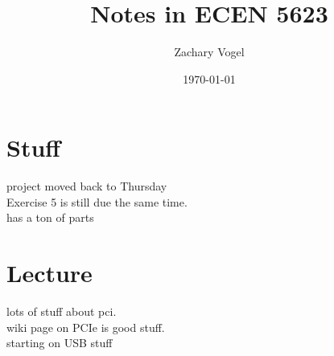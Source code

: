 \documentclass{article}
\author{Zachary Vogel}
\date{\today}
\title{Notes in ECEN 5623}
\begin{document}
\maketitle


\section*{Stuff}
project moved back to Thursday\\
Exercise 5 is still due the same time.\\
has a ton of parts\\

\section*{Lecture}
lots of stuff about pci.\\
wiki page on PCIe is good stuff.\\

starting on USB stuff\\
\end{document}
